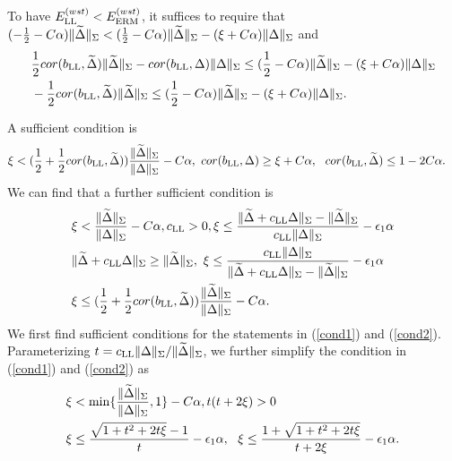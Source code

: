 To have $E_{\textup{LL}}^{(wst)}< E_{\textup{ERM}}^{(wst)}$, it suffices to require that $(-\frac{1}{2}-C\alpha)\|\widetilde{\Delta}\|_{\Sigma}< (\frac{1}{2}-C\alpha)\|\widetilde{\Delta}\|_{\Sigma}-(\xi+C\alpha)\|\Delta\|_{\Sigma}$ and
\begin{align*}
   &\frac{1}{2} cor(b_{\textup{LL}},\widetilde{\Delta})\|\widetilde{\Delta}\|_{\Sigma}-cor(b_{\textup{LL}},\Delta)\|\Delta\|_{\Sigma}\leq (\frac{1}{2}-C\alpha)\|\widetilde{\Delta}\|_{\Sigma}-(\xi+C\alpha)\|\Delta\|_{\Sigma}\\
   &-\frac{1}{2} cor(b_{\textup{LL}},\widetilde{\Delta})\|\widetilde{\Delta}\|_{\Sigma}\leq (\frac{1}{2}-C\alpha)\|\widetilde{\Delta}\|_{\Sigma}-(\xi+C\alpha)\|\Delta\|_{\Sigma}.
\end{align*}


A sufficient condition is
\begin{align*}
    & \xi < (\frac{1}{2}+\frac{1}{2}cor(b_{\textup{LL}},\widetilde{\Delta}))\frac{\|\widetilde{\Delta}\|_{\Sigma}}{\|\Delta\|_{\Sigma}}-C\alpha,~cor(b_{\textup{LL}},\Delta)\geq \xi+C\alpha,~~cor(b_{\textup{LL}},\widetilde{\Delta})\leq 1-2C\alpha.
\end{align*}
We can find that a further sufficient condition is
\begin{align}
   & \xi < \frac{\|\widetilde{\Delta}\|_{\Sigma}}{\|\Delta\|_{\Sigma}}-C\alpha, c_{\textup{LL}}> 0, \xi \le \frac{\|\widetilde{\Delta}+c_{\textup{LL}}\Delta\|_{\Sigma}-\|\widetilde{\Delta}\|_{\Sigma}}{c_{\textup{LL}}\|\Delta\|_{\Sigma}}-\epsilon_1\alpha\label{cond1}\\
    &\|\widetilde{\Delta}+c_{\textup{LL}}\Delta\|_{\Sigma}\geq \|\widetilde{\Delta}\|_{\Sigma},~\xi\leq \frac{c_{\textup{LL}}\|\Delta\|_{\Sigma}}{\|\widetilde{\Delta}+c_{\textup{LL}}\Delta\|_{\Sigma}-\|\widetilde{\Delta}\|_{\Sigma}}-\epsilon_1\alpha\label{cond2}\\
   & \xi \leq (\frac{1}{2}+\frac{1}{2}cor(b_{\textup{LL}},\widetilde{\Delta}))\frac{\|\widetilde{\Delta}\|_{\Sigma}}{\|\Delta\|_{\Sigma}}-C\alpha.\label{cond3}
\end{align}
We first find sufficient conditions for the statements in (\ref{cond1}) and (\ref{cond2}).
Parameterizing $t=c_{\textup{LL}}\|\Delta\|_{\Sigma}/\|\widetilde{\Delta}\|_{\Sigma}$, we further simplify the condition in (\ref{cond1}) and (\ref{cond2}) as
\begin{align*}
   & \xi < \min\{\frac{\|\widetilde{\Delta}\|_{\Sigma}}{\|\Delta\|_{\Sigma}},1\}-C\alpha,t(t+2\xi)>0\\
   &\xi\leq \frac{\sqrt{1+t^2+2t\xi}-1}{t}-\epsilon_1\alpha,~~\xi\leq \frac{1+\sqrt{1+t^2+2t\xi}}{t+2\xi}-\epsilon_1\alpha.
\end{align*}
